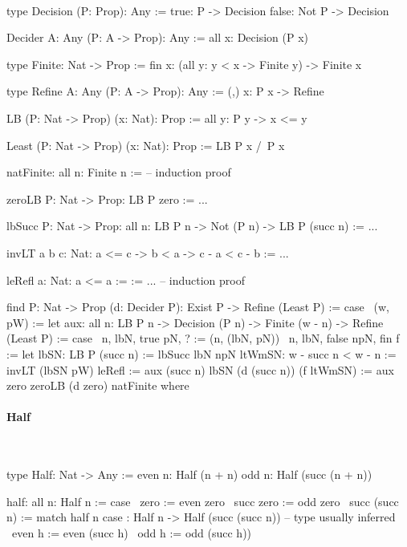 \ \begin{alba}
    type Decision (P: Prop): Any :=
        true:  P     -> Decision
        false: Not P -> Decision

    Decider {A: Any} (P: A -> Prop): Any :=
        all x: Decision (P x)

    type Finite: Nat -> Prop :=
        fin {x}: (all y: y < x -> Finite y) -> Finite x

    type Refine {A: Any} (P: A -> Prop): Any :=
        (,) x: P x -> Refine

    LB (P: Nat -> Prop) (x: Nat): Prop :=
        all {y}: P y -> x <= y

    Least (P: Nat -> Prop) (x: Nat): Prop :=
        LB P x /\ P x

    natFinite: all {n}: Finite n :=
        -- induction proof

    zeroLB {P: Nat -> Prop}: LB P zero := ...

    lbSucc {P: Nat -> Prop}:
        all {n}: LB P n -> Not (P n) -> LB P (succ n)
    := ...

    invLT {a b c: Nat}: a <= c -> b < a -> c - a < c - b
    := ...

    leRefl {a: Nat}: a <= a :=
    := ... -- induction proof

    find {P: Nat -> Prop} (d: Decider P): Exist P -> Refine (Least P)
    := case
        \ (w, pW) :=
            let
                aux: all n: LB P n -> Decision (P n) -> Finite (w - n)
                     -> Refine (Least P)
                := case
                    \ n, lbN, true pN, ? :=
                        (n, (lbN, pN))
                    \ n, lbN, false npN, fin f :=
                        let
                            lbSN: LB P (succ n) :=
                                lbSucc lbN npN
                            ltWmSN: w - succ n < w - n :=
                                invLT (lbSN pW) leRefl
                        :=
                            aux (succ n) lbSN (d (succ n)) (f ltWmSN)
            :=
                aux zero zeroLB (d zero) natFinite where
\end{alba}





\paragraph{Half}

\ \begin{alba}
    type Half: Nat -> Any :=
        even n: Half (n + n)
        odd  n: Half (succ (n + n))

    half: all n: Half n := case
        \ zero          :=   even zero
        \ succ zero     :=   odd zero
        \ succ (succ n) :=
            match half n case
                : Half n -> Half (succ (succ n)) -- type usually inferred
                \ even h := even (succ h)
                \ odd  h := odd  (succ h))
\end{alba}

